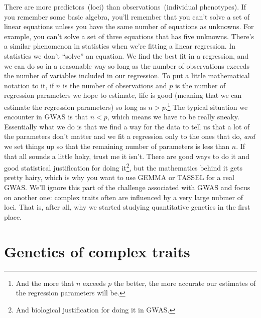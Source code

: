 There are more predictors~(loci) than observations~(individual
phenotypes). If you remember some basic algebra, you'll remember that
you can't solve a set of linear equations unless you have the same
number of equations as unknowns. For example, you can't solve a set of
three equations that has five unknowns. There's a similar phenomenon
in statistics when we're fitting a linear regression. In statistics we
don't ``solve'' an equation. We find the best fit in a regression, and
we can do so in a reasonable way so long as the number of observations
exceeds the number of variables included in our regression. To put a
little mathematical notation to it, if $n$ is the number of
observations and $p$ is the number of regression parameters we hope to
estimate, life is good (meaning that we can estimate the regression
parameters) so long as $n > p$.\footnote{And the more that $n$ exceeds
  $p$ the better, the more accurate our estimates of the regression
  parameters will be.} The typical situation we encounter in GWAS is
that $n < p$, which means we have to be really sneaky. Essentially
what we do is that we find a way for the data to tell us that a lot of
the parameters don't matter and we fit a regression only to the ones
that do, {\it and\/} we set things up so that the remaining number of
parameters is less than $n$. If that all sounds a little hoky, trust
me it isn't. There are good ways to do it and good statistical
justification for doing it\footnote{And biological justification for
  doing it in GWAS.}, but the mathematics behind it gets pretty hairy,
which is why you want to use GEMMA or TASSEL for a real GWAS. We'll
ignore this part of the challenge associated with GWAS and focus on
another one: complex traits often are influenced by a very large
nubmer of loci. That is, after all, why we started studying
quantitative genetics in the first place.

\section*{Genetics of complex traits}

